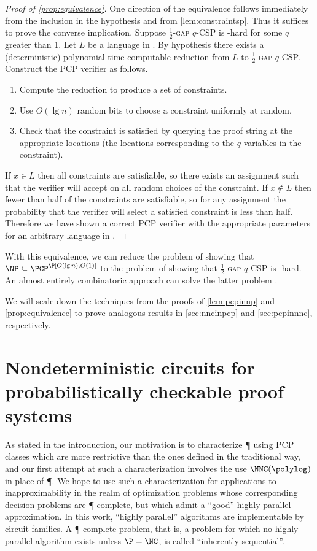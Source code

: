 \documentclass{article}
\begin{document}
\begin{proof}[Proof of \autoref{prop:equivalence}]
  One direction of the equivalence follows immediately from the inclusion in the hypothesis and from \autoref{lem:constraintsp}.
  Thus it suffices to prove the converse implication.
  Suppose \textsc{$\frac{1}{2}$-gap $q$-CSP} is \NP-hard for some $q$ greater than 1.
  Let $L$ be a language in \NP.
  By hypothesis there exists a (deterministic) polynomial time computable reduction from $L$ to \textsc{$\frac{1}{2}$-gap $q$-CSP}.
  Construct the PCP verifier as follows.
  \begin{enumerate}
  \item Compute the reduction to produce a set of constraints.
  \item Use $O(\lg n)$ random bits to choose a constraint uniformly at random.
  \item Check that the constraint is satisfied by querying the proof string at the appropriate locations (the locations corresponding to the $q$ variables in the constraint).
  \end{enumerate}

  If $x \in L$ then all constraints are satisfiable, so there exists an assignment such that the verifier will accept on all random choices of the constraint.
  If $x \notin L$ then fewer than half of the constraints are satisfiable, so for any assignment the probability that the verifier will select a satisfied constraint is less than half.
  Therefore we have shown a correct PCP verifier with the appropriate parameters for an arbitrary language in \NP.
\end{proof}
With this equivalence, we can reduce the problem of showing that $\NP \subseteq \PCP^\P[O(\lg n), O(1)]$ to the problem of showing that \textsc{$\frac{1}{2}$-gap $q$-CSP} is \NP-hard.
An almost entirely combinatoric approach can solve the latter problem \cite{dinur07}.

We will scale down the techniques from the proofs of \autoref{lem:pcpinnp} and \autoref{prop:equivalence} to prove analogous results in \autoref{sec:nncinpcp} and \autoref{sec:pcpinnnc}, respectively.

\section{Nondeterministic \texorpdfstring{\NC}{NC} circuits for probabilistically checkable proof systems}\label{sec:nncinpcp}

As stated in the introduction, our motivation is to characterize \P{} using PCP classes which are more restrictive than the ones defined in the traditional way, and our first attempt at such a characterization involves the use $\NNC(\polylog)$ in place of \P.
We hope to use such a characterization for applications to inapproximability in the realm of optimization problems whose corresponding decision problems are \P-complete, but which admit a ``good'' highly parallel approximation.
In this work, ``highly parallel'' algorithms are implementable by \NC{} circuit families.
A \P-complete problem, that is, a problem for which no highly parallel algorithm exists unless $\P = \NC$, is called ``inherently sequential''.
\end{document}
